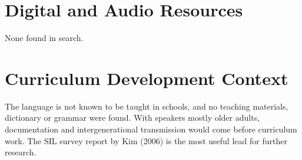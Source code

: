 \documentclass[12pt]{article}
\begin{document}
\section{Digital and Audio Resources}
None found in search.

\section{Curriculum Development Context}
The language is not known to be taught in schools, and no teaching materials, dictionary or grammar were found. With speakers mostly older adults, documentation and intergenerational transmission would come before curriculum work. The SIL survey report by Kim (2006) is the most useful lead for further research.
\end{document}
